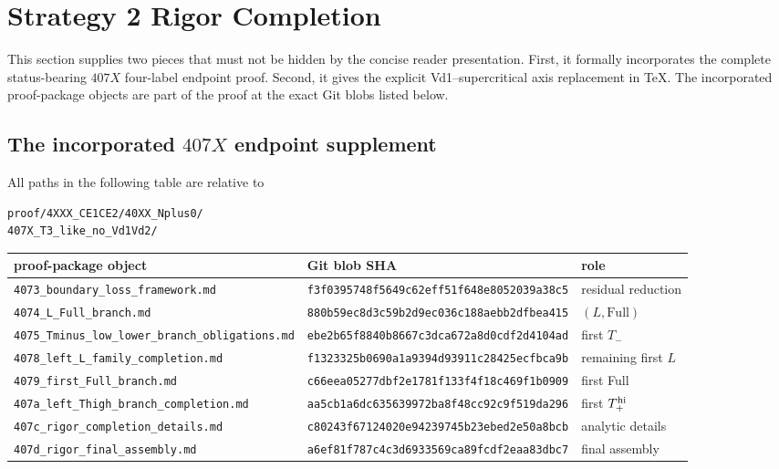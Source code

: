 \section{Strategy 2 Rigor Completion}
\label{sec:strategy2-rigor-completion}

This section supplies two pieces that must not be hidden by the concise reader
presentation.  First, it formally incorporates the complete status-bearing
$407X$ four-label endpoint proof.  Second, it gives the explicit
Vd1--supercritical axis replacement in TeX.  The incorporated proof-package
objects are part of the proof at the exact Git blobs listed below.

\subsection{The incorporated \(407X\) endpoint supplement}

All paths in the following table are relative to
\begin{verbatim}
proof/4XXX_CE1CE2/40XX_Nplus0/
407X_T3_like_no_Vd1Vd2/
\end{verbatim}

\begin{center}
\scriptsize
\renewcommand{\arraystretch}{1.08}
\begin{tabular}{p{}p{}p{}}
\toprule
proof-package object&Git blob SHA&role\\
\midrule
\texttt{4073\_boundary\_loss\_framework.md}&
\texttt{f3f0395748f5649c62eff51f648e8052039a38c5}&residual reduction\\
\texttt{4074\_L\_Full\_branch.md}&
\texttt{880b59ec8d3c59b2d9ec036c188aebb2dfbea415}&$(L,\mathrm{Full})$\\
\texttt{4075\_Tminus\_low\_lower\_branch\_obligations.md}&
\texttt{ebe2b65f8840b8667c3dca672a8d0cdf2d4104ad}&first $T_-$\\
\texttt{4078\_left\_L\_family\_completion.md}&
\texttt{f1323325b0690a1a9394d93911c28425ecfbca9b}&remaining first $L$\\
\texttt{4079\_first\_Full\_branch.md}&
\texttt{c66eea05277dbf2e1781f133f4f18c469f1b0909}&first Full\\
\texttt{407a\_left\_Thigh\_branch\_completion.md}&
\texttt{aa5cb1a6dc635639972ba8f48cc92c9f519da296}&first $T_+^{\rm hi}$\\
\texttt{407c\_rigor\_completion\_details.md}&
\texttt{c80243f67124020e94239745b23ebed2e50a8bcb}&analytic details\\
\texttt{407d\_rigor\_final\_assembly.md}&
\texttt{a6ef81f787c4c3d6933569ca89fcdf2eaa83dbc7}&final assembly\\
\bottomrule
\end{tabular}
\end{center}

